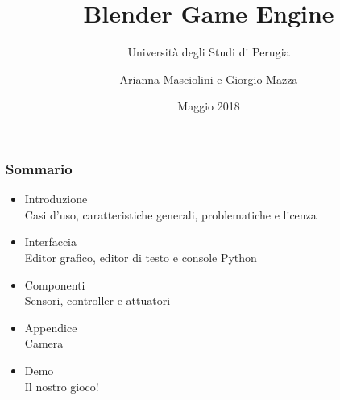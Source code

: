\documentclass{beamer}
\title{Blender Game Engine}
\subtitle{Università degli Studi di Perugia}
\author{Arianna Masciolini e Giorgio Mazza}
\institute{UniPG}
\date{Maggio 2018}
\begin{document}
	\setcounter{showProgressBar}{0}
	\setcounter{showSlideNumbers}{0}

	\frame{\titlepage}
	\begin{frame}
		\frametitle{Sommario}
		\begin{itemize}
			\item Introduzione \\ {\footnotesize\hspace{1em} Casi d'uso, caratteristiche generali, problematiche e licenza}
			\item Interfaccia \\ {\footnotesize\hspace{1em} Editor grafico, editor di testo e console Python}
			\item Componenti \\ {\footnotesize\hspace{1em} Sensori, controller e attuatori}
			\item Appendice \\ {\footnotesize\hspace{1em} Camera}
			\item Demo \\ {\footnotesize\hspace{1em} Il nostro gioco!}
		\end{itemize}
	\end{frame}

	\setcounter{framenumber}{0}
	\setcounter{showProgressBar}{1}
	\setcounter{showSlideNumbers}{1}
\end{document}
